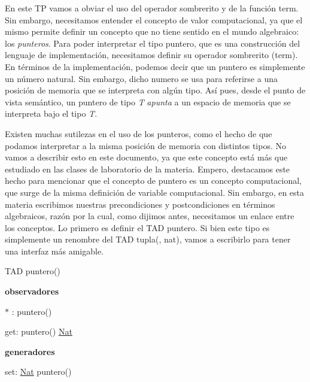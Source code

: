 \-En este \-T\-P vamos a obviar el uso del operador sombrerito y de la función term. \-Sin embargo, necesitamos entender el concepto de valor computacional, ya que el mismo permite definir un concepto que no tiene sentido en el mundo algebraico\-: los {\itshape punteros\/}. \-Para poder interpretar el tipo puntero, que es una construcción del lenguaje de implementación, necesitamos definir su operador sombrerito (term). \-En términos de la implementación, podemos decir que un puntero es simplemente un número natural. \-Sin embargo, dicho numero se usa para referirse a una posición de memoria que se interpreta con algún tipo. \-Así pues, desde el punto de vista semántico, un puntero de tipo {\itshape \-T\/} {\itshape apunta\/} a un espacio de memoria que se interpreta bajo el tipo {\itshape \-T\/}.

\-Existen muchas sutilezas en el uso de los punteros, como el hecho de que podamos interpretar a la misma posición de memoria con distintos tipos. \-No vamos a describir esto en este documento, ya que este concepto está más que estudiado en las clases de laboratorio de la materia. \-Empero, destacamos este hecho para mencionar que el concepto de puntero es un concepto computacional, que surge de la misma definición de variable computacional. \-Sin embargo, en esta materia escribimos nuestras precondiciones y postcondiciones en términos algebraicos, razón por la cual, como dijimos antes, necesitamos un enlace entre los conceptos. \-Lo primero es definir el \-T\-A\-D puntero. \-Si bien este tipo es simplemente un renombre del \-T\-A\-D tupla(, nat), vamos a escribirlo para tener una interfaz más amigable.

\-T\-A\-D puntero()\par
 {\bfseries observadores} \par

\begin{DoxyItemize}
\item $\ast$ \-: puntero()  \par

\item get\-: puntero()  \hyperlink{classNat}{\-Nat}
\end{DoxyItemize}

{\bfseries generadores} \par

\begin{DoxyItemize}
\item set\-: \hyperlink{classNat}{\-Nat}    puntero()
\end{DoxyItemize}

